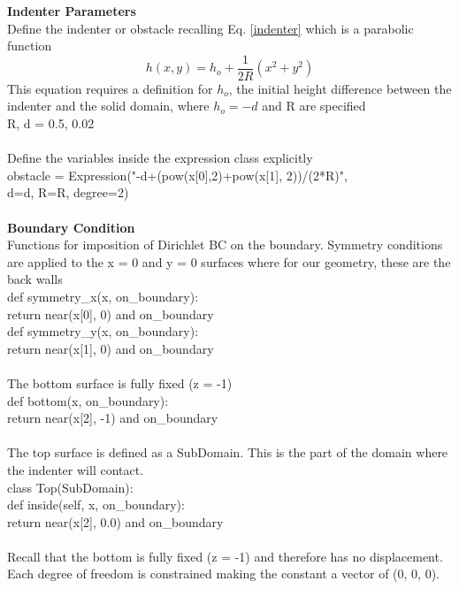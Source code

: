 \documentclass[12pt,3p]{article}
\begin{document}
\textbf{Indenter Parameters} \\
Define the indenter or obstacle recalling Eq. \ref{indenter} which is a parabolic function
\begin{equation*}
h(x,y) = h_o + \frac{1}{2R} (x^2 + y^2)
\end{equation*}
This equation requires a definition for $h_o$, the initial height difference between the indenter and the solid domain, where $h_o = -d$ and R are specified \\
{\selectfont
R, d = 0.5, 0.02 \\ \\ 
}
Define the variables inside the expression class explicitly \\
{\selectfont
obstacle = Expression("-d+(pow(x[0],2)+pow(x[1], 2))/(2*R)", \\
\indent \indent \indent \indent \indent \indent \indent \indent \indent  d=d, R=R, degree=2) \\ \\
}
\textbf{Boundary Condition} \\
Functions for imposition of Dirichlet BC on the boundary. Symmetry conditions are applied to the x = 0 and y = 0 surfaces where for our geometry, these are the back walls \\
{\selectfont
def symmetry\_x(x, on\_boundary): \\
\indent return near(x[0], 0) and on\_boundary \\
def symmetry\_y(x, on\_boundary): \\
\indent return near(x[1], 0) and on\_boundary \\ \\
}
The bottom surface is fully fixed (z = -1) \\
{\selectfont
def bottom(x, on\_boundary): \\
\indent return near(x[2], -1) and on\_boundary \\ \\
}
The top surface is defined as a {\selectfont SubDomain}. This is the part of the domain where the indenter will contact. \\
{\selectfont
class Top(SubDomain): \\
\indent def inside(self, x, on\_boundary): \\
\indent \indent return near(x[2], 0.0) and on\_boundary \\ \\
}
Recall that the bottom is fully fixed (z = -1) and therefore has no displacement. Each degree of freedom is constrained making the constant a vector of (0, 0, 0). \\
\end{document}
